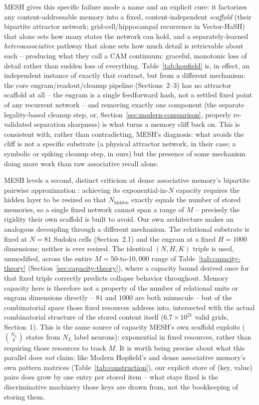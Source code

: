 \documentclass[11pt]{article}
\begin{document}
MESH \cite{sharma2022} gives this specific failure mode a name and an explicit cure: it
factorizes any content-addressable memory into a fixed, content-independent \emph{scaffold}
(their bipartite attractor network; grid-cell/hippocampal recurrence in Vector-HaSH) that alone
sets how many states the network can hold, and a separately-learned \emph{heteroassociative}
pathway that alone sets how much detail is retrievable about each -- producing what they call a
CAM continuum: graceful, monotonic loss of detail rather than sudden loss of everything.
Table~\ref{tab:hopfield} is, in effect, an independent instance of exactly that contrast, but
from a different mechanism: the core engram/readout/cleanup pipeline (Sections~2--3) has no
attractor scaffold at all -- the engram is a single feedforward hash, not a settled fixed point
of any recurrent network -- and removing exactly one component (the separate legality-based
cleanup step, or, Section~\ref{sec:modern-comparison}, properly re-validated separation
sharpness) is what turns a memory cliff back on. This is consistent with, rather than
contradicting, MESH's diagnosis: what avoids the cliff is not a specific substrate (a physical
attractor network, in their case; a symbolic or spiking cleanup step, in ours) but the presence
of some mechanism doing more work than raw associative recall alone.

MESH levels a second, distinct criticism at dense associative memory's bipartite pairwise
approximation \cite{sharma2022}: achieving its exponential-in-$N$ capacity requires the hidden
layer to be resized so that $N_{\mathrm{hidden}}$ exactly equals the number of stored memories,
so a single fixed network cannot span a range of $M$ -- precisely the rigidity their own
scaffold is built to avoid. Our own architecture makes an analogous decoupling through a
different mechanism. The relational substrate is fixed at $N{=}81$ Sudoku cells (Section~2.1)
and the engram at a fixed $H{=}1000$ dimensions; neither is ever resized. The identical
$(N,H,K)$ triple is used, unmodified, across the entire $M{=}50$-to-$10{,}000$ range of
Table~\ref{tab:capacity-theory} (Section~\ref{sec:capacity-theory}), where a capacity bound
derived once for that fixed triple correctly predicts collapse behavior throughout. Memory
capacity here is therefore not a property of the number of relational units or engram
dimensions directly -- $81$ and $1000$ are both minuscule -- but of the combinatorial space
those fixed resources address into, intersected with the actual combinatorial structure of the
stored content itself ($6.7\times10^{21}$ valid grids, Section~1). This is the same source of
capacity MESH's own scaffold exploits ($\binom{N_L}{k}$ states from $N_L$ label neurons):
exponential in fixed resources, rather than requiring those resources to track $M$. It is worth
being precise about what this parallel does \emph{not} claim: like Modern Hopfield's and dense
associative memory's own pattern matrices (Table~\ref{tab:construction}), our explicit store of
(key, value) pairs does grow by one entry per stored item -- what stays fixed is the
discriminative machinery those keys are drawn from, not the bookkeeping of storing them.
\end{document}
